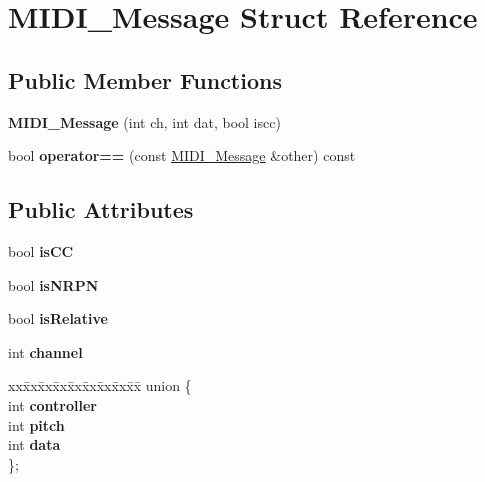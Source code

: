 \hypertarget{struct_m_i_d_i___message}{}\section{M\+I\+D\+I\+\_\+\+Message Struct Reference}
\label{struct_m_i_d_i___message}
\subsection*{Public Member Functions}
\begin{DoxyCompactItemize}
\item 
{\bfseries M\+I\+D\+I\+\_\+\+Message} (int ch, int dat, bool iscc)\hypertarget{struct_m_i_d_i___message_ada792c9fea8cd5017e5c6b8666a33b5c}{}\label{struct_m_i_d_i___message_ada792c9fea8cd5017e5c6b8666a33b5c}

\item 
bool {\bfseries operator==} (const \hyperlink{struct_m_i_d_i___message}{M\+I\+D\+I\+\_\+\+Message} \&other) const \hypertarget{struct_m_i_d_i___message_a392801f089a416dcadcad02500f4bf8e}{}\label{struct_m_i_d_i___message_a392801f089a416dcadcad02500f4bf8e}

\end{DoxyCompactItemize}
\subsection*{Public Attributes}
\begin{DoxyCompactItemize}
\item 
bool {\bfseries is\+CC}\hypertarget{struct_m_i_d_i___message_a9483383e9b4594a7b018f70779a645e7}{}\label{struct_m_i_d_i___message_a9483383e9b4594a7b018f70779a645e7}

\item 
bool {\bfseries is\+N\+R\+PN}\hypertarget{struct_m_i_d_i___message_a131f956eb4979db566c060b2dd902d37}{}\label{struct_m_i_d_i___message_a131f956eb4979db566c060b2dd902d37}

\item 
bool {\bfseries is\+Relative}\hypertarget{struct_m_i_d_i___message_a00bfe36050f78311ecad9311e2bfbb85}{}\label{struct_m_i_d_i___message_a00bfe36050f78311ecad9311e2bfbb85}

\item 
int {\bfseries channel}\hypertarget{struct_m_i_d_i___message_aef8c0d76db2303f5b184ed3f0cec0034}{}\label{struct_m_i_d_i___message_aef8c0d76db2303f5b184ed3f0cec0034}

\item 
\begin{tabbing}
xx\=xx\=xx\=xx\=xx\=xx\=xx\=xx\=xx\=\kill
union \{\\
\>int {\bfseries controller}\\
\>int {\bfseries pitch}\\
\>int {\bfseries data}\\
\}; \hypertarget{struct_m_i_d_i___message_a44441e6433aee6b0e252c3b5ec193724}{}\label{struct_m_i_d_i___message_a44441e6433aee6b0e252c3b5ec193724}
\\

\end{tabbing}\end{DoxyCompactItemize}


